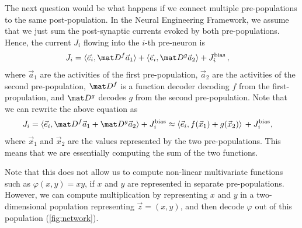 \documentclass[10pt,letterpaper,oneside]{article}
\begin{document}
	The next question would be what happens if we connect multiple pre-populations to the same post-population. In the Neural Engineering Framework, we assume that we just sum the post-synaptic currents evoked by both pre-populations. Hence, the current $J_i$ flowing into the $i$-th pre-neuron is
	\begin{align*}
		J_i &= \langle \vec e_i, \mat D^f \vec a_1 \rangle + \langle \vec e_i, \mat D^g \vec a_2 \rangle + J^\mathrm{bias}_i \,,
	\end{align*}
	where $\vec a_1$ are the activities of the first pre-population, $\vec a_2$ are the activities of the second pre-population, $\mat D^f$ is a function decoder decoding $f$ from the first-propulation, and $\mat D^g$ decodes $g$ from the second pre-population. Note that we can rewrite the above equation as
	\begin{align*}
		J_i &= \langle \vec e_i, \mat D^f \vec a_1 + \mat D^g \vec a_2 \rangle + J^\mathrm{bias}_i \approx \langle \vec e_i, f(\vec x_1) + g(\vec x_2) \rangle \, + J^\mathrm{bias}_i,
	\end{align*}
	where $\vec x_1$ and $\vec x_2$ are the values represented by the two pre-populations. This means that we are essentially computing the sum of the two functions.

	Note that this does not allow us to compute non-linear multivariate functions such as $\varphi(x, y) = xy$, if $x$ and $y$ are represented in separate pre-populations. However, we can compute multiplication by representing $x$ and $y$ in a two-dimensional population representing $\vec z = (x, y)$, and then decode $\varphi$ out of this population (\cref{fig:network}).
	\printbibliography
	
\end{document}
